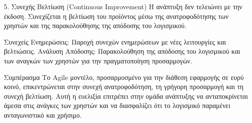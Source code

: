 \documentclass{article}
\begin{document}
5. Συνεχής Βελτίωση (\textlatin{Continuous Improvement})
Η ανάπτυξη δεν τελειώνει με την έκδοση. Συνεχίζεται η βελτίωση του προϊόντος μέσω της ανατροφοδότησης των χρηστών και της παρακολούθησης της απόδοσης του λογισμικού.

Συνεχείς Ενημερώσεις: Παροχή συνεχών ενημερώσεων με νέες λειτουργίες και βελτιώσεις.
Ανάλυση Απόδοσης: Παρακολούθηση της απόδοσης του λογισμικού και των αναγκών των χρηστών για την πραγματοποίηση προσαρμογών.

Συμπέρασμα
Το \textlatin{Agile} μοντέλο, προσαρμοσμένο για την διάθεση εφαρμογής σε ευρύ κοινό, επικεντρώνεται στην συνεχή ανατροφοδότηση, τη γρήγορη προσαρμογή και τη συνεχή βελτίωση. Αυτή η ευελιξία επιτρέπει στην ομάδα ανάπτυξης να ανταποκρίνεται άμεσα στις ανάγκες των χρηστών και να διασφαλίζει ότι το λογισμικό παραμένει ανταγωνιστικό και χρήσιμο.
\end{document}
